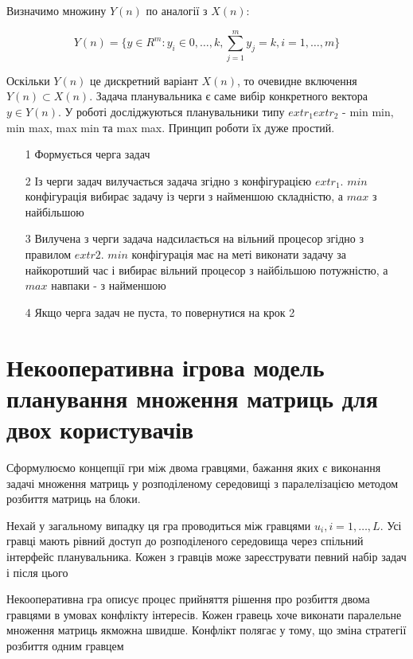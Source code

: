 Визначимо множину $Y(n)$ по аналогії з $X(n)$:

\begin{equation}
	\label{eq:Y(n)}
	Y(n) = \big\{y \in R^m : y_i \in {0, \ldots, k}, \sum_{j = 1}^{m} y_j = k, i = 1,\ldots,m \big\}
\end{equation}

Оскільки $Y(n)$ це дискретний варіант $X(n)$, то очевидне включення $Y(n) \subset X(n)$.
Задача планувальника є саме вибір конкретного вектора $y \in Y(n)$.
У роботі досліджуються планувальники типу $extr_1 extr_2$ - min min, min max, max min та max max. Принцип роботи їх дуже простий.

\begin{itemize}
	\item[1] Формується черга задач
	\item[2] Із черги задач вилучається задача згідно з конфігурацією $extr_1$. $min$ конфігурація вибирає задачу із черги з найменшою складністю, а $max$ з найбільшою
	\item[3] Вилучена з черги задача надсилається на вільний процесор згідно з правилом $extr2$. $min$ конфігурація має на меті виконати задачу за найкоротший час і вибирає вільний процесор з найбільшою потужністю, а $max$ навпаки - з найменшою
	\item[4] Якщо черга задач не пуста, то повернутися на крок 2
\end{itemize}

\section{Некооперативна ігрова модель планування множення матриць для двох користувачів}

Сформулюємо концепції гри між двома гравцями, бажання яких є виконання задачі множення матриць у розподіленому середовищі з паралелізацією методом розбиття матриць на блоки.

Нехай у загальному випадку ця гра проводиться між гравцями ${u_i}, i=1,\ldots,L$. Усі гравці мають рівний доступ до розподіленого середовища через спільний інтерфейс планувальника. Кожен з гравців може зареєструвати певний набір задач і після цього

Некооперативна гра описує процес прийняття рішення про розбиття двома гравцями в умовах конфлікту інтересів. Кожен гравець хоче виконати паралельне множення матриць якможна швидше. Конфлікт полягає у тому, що зміна стратегії розбиття одним гравцем


